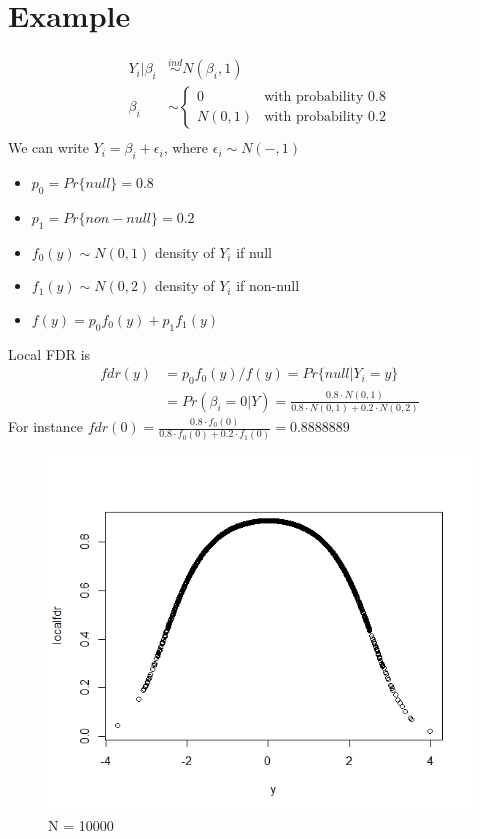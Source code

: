 \documentclass[11pt]{article}
\begin{document}
\section{Example}
\begin{align*}
Y_i | \beta_i&  \stackrel{ind}{\sim}N(\beta_i,1)\\
\beta_i& \sim \begin{cases} 0 &\text{with probability 0.8} \\
N(0,1) &\text{with probability 0.2} \end{cases} \\
\end{align*}
We can write $Y_i = \beta_i + \epsilon_i$, where $\epsilon_i \sim N(-,1)$
\begin{itemize}
	\item $p_0 = Pr\{null\} = 0.8$
	\item $p_1 = Pr\{non-null\} = 0.2$
	\item $f_0(y) \sim N(0,1)$ density of $Y_i$ if null
	\item $f_1(y) \sim N(0,2)$ density of $Y_i$ if non-null
	\item $f(y) = p_0 f_0(y) + p_1 f_1(y)$
\end{itemize}
Local FDR is
\begin{align*}
fdr(y) &= p_0 f_0(y) / f(y) = Pr\{null | Y_i = y\}\\
&=Pr(\beta_i = 0 | Y) = \frac{0.8 \cdot N(0,1)}{0.8 \cdot N(0,1) + 0.2 \cdot N(0,2)}
\end{align*}
For instance $fdr(0) = \frac{0.8 \cdot f_0(0)}{0.8 \cdot f_0(0) + 0.2 \cdot f_1(0)} = 0.8888889 $

\begin{figure}[h]
	\centering
	\includegraphics[width=0.7\linewidth]{Rplot02}
	\caption{N = 10000}
	\label{fig:rplot}
\end{figure}
\end{document}
